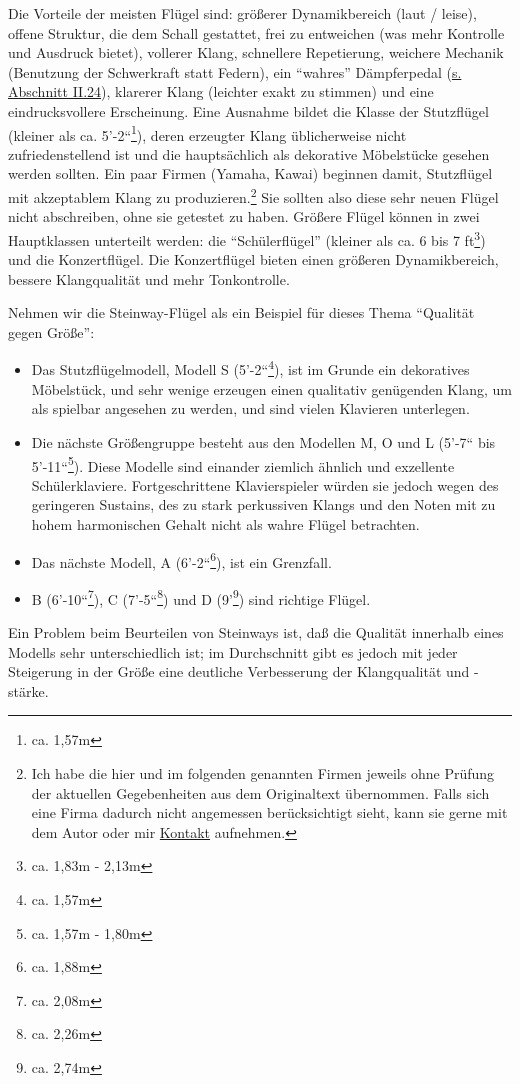 Die Vorteile der meisten Flügel sind: größerer Dynamikbereich (laut / leise), offene Struktur, die dem Schall gestattet, frei zu entweichen (was mehr Kontrolle und Ausdruck bietet), vollerer Klang, schnellere Repetierung, weichere Mechanik (Benutzung der Schwerkraft statt Federn), ein \enquote{wahres} Dämpferpedal (\hyperlink{c1ii24}{s. Abschnitt II.24}), klarerer Klang (leichter exakt zu stimmen) und eine eindrucksvollere Erscheinung.
Eine Ausnahme bildet die Klasse der Stutzflügel (kleiner als ca. 5'-2``\footnote{ca. 1,57m}), deren erzeugter Klang üblicherweise nicht zufriedenstellend ist und die hauptsächlich als dekorative Möbelstücke gesehen werden sollten.
Ein paar Firmen (Yamaha, Kawai) beginnen damit, Stutzflügel mit akzeptablem Klang zu produzieren.\footnote{Ich habe die hier und im folgenden genannten Firmen jeweils ohne Prüfung der aktuellen Gegebenheiten aus dem Originaltext übernommen.
Falls sich eine Firma dadurch nicht angemessen berücksichtigt sieht, kann sie gerne mit dem Autor oder mir \hyperlink{kontakt}{Kontakt} aufnehmen.}
Sie sollten also diese sehr neuen Flügel nicht abschreiben, ohne sie getestet zu haben.
Größere Flügel können in zwei Hauptklassen unterteilt werden: die \enquote{Schülerflügel}  (kleiner als ca. 6 bis 7 ft\footnote{ca. 1,83m - 2,13m}) und die Konzertflügel.
Die Konzertflügel bieten einen größeren Dynamikbereich, bessere Klangqualität und mehr Tonkontrolle.

Nehmen wir die Steinway-Flügel als ein Beispiel für dieses Thema \enquote{Qualität gegen Größe}:

\begin{itemize} 
\item Das Stutzflügelmodell, Modell S (5'-2``\footnote{ca. 1,57m}), ist im Grunde ein dekoratives Möbelstück, und sehr wenige erzeugen einen qualitativ genügenden Klang, um als spielbar angesehen zu werden, und sind vielen Klavieren unterlegen.
\item Die nächste Größengruppe besteht aus den Modellen M, O und L (5'-7`` bis 5'-11``\footnote{ca. 1,57m - 1,80m}).
Diese Modelle sind einander ziemlich ähnlich und exzellente Schülerklaviere.
Fortgeschrittene Klavierspieler würden sie jedoch wegen des geringeren Sustains, des zu stark perkussiven Klangs und den Noten mit zu hohem harmonischen Gehalt nicht als wahre Flügel betrachten.
\item Das nächste Modell, A (6'-2``\footnote{ca. 1,88m}), ist ein Grenzfall.
\item B (6'-10``\footnote{ca. 2,08m}), C (7'-5``\footnote{ca. 2,26m}) und D (9'\footnote{ca. 2,74m}) sind richtige Flügel.
 \end{itemize}
Ein Problem beim Beurteilen von Steinways ist, daß die Qualität innerhalb eines Modells sehr unterschiedlich ist; im Durchschnitt gibt es jedoch mit jeder Steigerung in der Größe eine deutliche Verbesserung der Klangqualität und -stärke.

